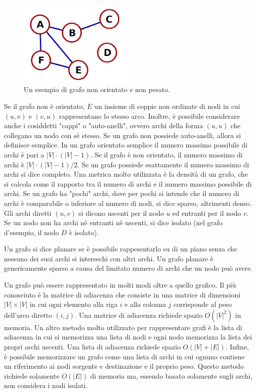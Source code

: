 \documentclass[12pt,a4paper,oneside]{book}
\begin{document}
	\begin{figure}
		\centering
		\includegraphics[width=0.5\textwidth]{grafo-esempio}
		\caption{Un esempio di grafo non orientato e non pesato.}
		\label{fig:grafo-esempio}
	\end{figure}

	Se il grafo non è orientato, $E$ un insieme di coppie non ordinate di nodi in cui $(u,v)$ e $(v,u)$ rappresentano lo stesso arco.	Inoltre, è possibile considerare anche i cosiddetti "cappi" o "auto-anelli", ovvero archi della forma $(u,u)$ che collegano un nodo con sè stesso. Se un grafo non possiede auto-anelli, allora si definisce semplice. In un grafo orientato semplice il numero massimo possibile di archi è pari a $|V|\cdot(|V|-1)$. Se il grafo è non orientato, il numero massimo di archi è $|V|\cdot(|V|-1)/2$. Se un grafo possiede esattamente il numero massimo di archi si dice completo. Una metrica molto utilizzata è la densità di un grafo, che si calcola come il rapporto tra il numero di archi e il numero massimo possibile di archi. Se un grafo ha "pochi" archi, dove per pochi si intende che il numero di archi è comparabile o inferiore al numero di nodi, si dice sparso, altrimenti denso. Gli archi diretti $(u,v)$ si dicono uscenti per il nodo $u$ ed entranti per il nodo $v$. Se un nodo non ha archi nè entranti nè uscenti, si dice isolato (nel grafo d'esempio, il nodo $D$ è isolato).
	
	Un grafo si dice planare se è possibile rappesentarlo su di un piano senza che nessuno dei suoi archi si intersechi con altri archi. Un grafo planare è genericamente sparso a causa del limitato numero di archi che un nodo può avere.
	
	Un grafo può essere rappresentato in molti modi oltre a quello grafico. Il più conosciuto è la matrice di adiacenza che consiste in una matrice di dimensioni $|V|\times |V|$ in cui ogni elemento alla riga $i$ e alla colonna $j$ corrisponde al peso dell'arco diretto $(i,j)$. Una matrice di adiacenza richiede spazio $O(|V|^2)$ in memoria. Un altro metodo molto utilizzato per rappresentare grafi è la lista di adiacenza in cui si memorizza una lista di nodi e ogni nodo memorizza la lista dei propri archi uscenti. Una lista di adiacenza richiede spazio $O(|V|+|E|)$. Infine, è possibile memorizzare un grafo come una lista di archi in cui ognuno contiene un riferimento ai nodi sorgente e destinazione e il proprio peso. Questo metodo richiede solamente $O(|E|)$ di memoria ma, essendo basato solamente sugli archi, non considera i nodi isolati.
	
\end{document}
